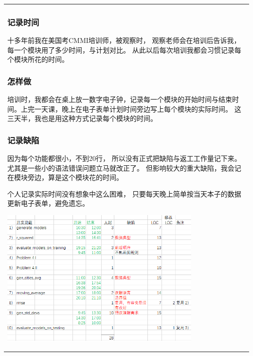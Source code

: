 \begin{longtable}[]{@{}l@{}}
\toprule
\endhead
\begin{minipage}[t]{0.97\columnwidth}\raggedright
\hypertarget{ux8bb0ux5f55ux65f6ux95f4}{%
\subsubsection{记录时间}\label{ux8bb0ux5f55ux65f6ux95f4}}

十多年前我在美国考CMMI培训师，被观察时，
观察老师会在培训后告诉我，每一个模块用了多少时间，与计划对比。
从此以后每次培训我都会习惯记录每个模块所花的时间。

\hypertarget{ux600eux6837ux505a}{%
\subsubsection{怎样做}\label{ux600eux6837ux505a}}

培训时，我都会在桌上放一数字电子钟，记录每一个模块的开始时间与结束时间。上完一天课，晚上在电子表单计划时间旁边写上每个模块的实际时间。
这三天半，我也是用这种方式记录每个模块的时间。

\hypertarget{ux8bb0ux5f55ux7f3aux9677}{%
\subsubsection{记录缺陷}\label{ux8bb0ux5f55ux7f3aux9677}}

因为每个功能都很小，不到20行， 所以没有正式把缺陷与返工工作量记下来。
尤其是一些小的语法错误问题立马就改正了。
但影响较大的重大缺陷，我会记在模块旁边，算是这个模块花的时间。

个人记录实际时间没有想象中这么困难，
只要每天晚上简单按当天本子的数据更新电子表单，避免遗忘。


\includegraphics[width=10cm]{PspLogScreenshot20211006174917.png}


\end{minipage}
\end{longtable}
